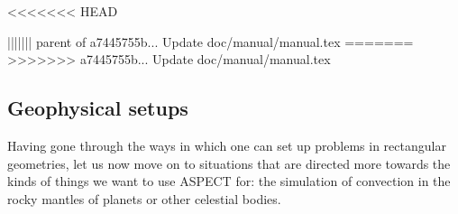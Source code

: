 \documentclass{article}
\newcommand{\aspect}{\textsc{ASPECT}}
\begin{document}
<<<<<<< HEAD


||||||| parent of a7445755b... Update doc/manual/manual.tex
=======
>>>>>>> a7445755b... Update doc/manual/manual.tex


\subsection{Geophysical setups}
\label{sec:cookbooks-geophysical}

Having gone through the ways in which one can set up problems in rectangular
geometries, let us now move on to situations that are directed more towards the
kinds of things we want to use \aspect{} for: the simulation of convection in
the rocky mantles of planets or other celestial bodies.
\end{document}

